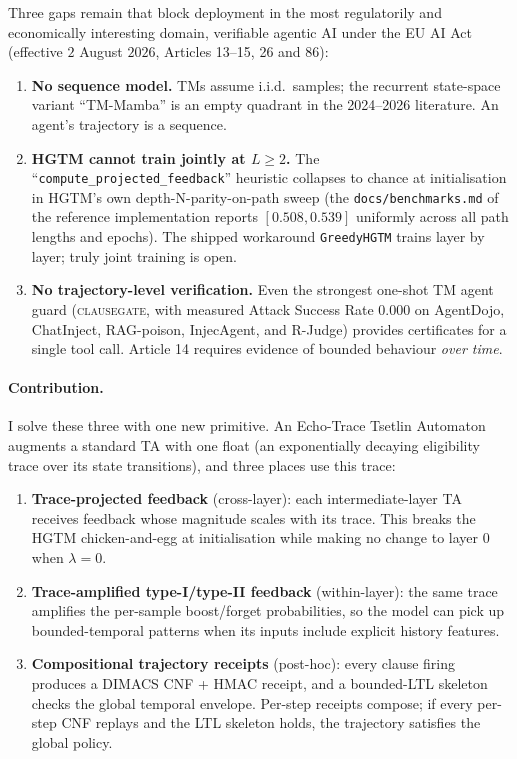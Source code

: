 \documentclass[11pt]{article}
\begin{document}
Three gaps remain that block deployment in the most regulatorily and economically interesting domain, verifiable agentic AI under the EU AI Act (effective $2$ August $2026$, Articles 13--15, 26 and 86):

\begin{enumerate}[label=(\roman*)]
\item \textbf{No sequence model.} TMs assume i.i.d.\ samples; the recurrent state-space variant ``TM-Mamba'' is an empty quadrant in the 2024--2026 literature.  An agent's trajectory is a sequence.
\item \textbf{HGTM cannot train jointly at $L \!\geq\! 2$.} The ``\texttt{compute\_projected\_feedback}'' heuristic collapses to chance at initialisation in HGTM's own depth-N-parity-on-path sweep (the \texttt{docs/benchmarks.md} of the reference implementation reports $[0.508, 0.539]$ uniformly across all path lengths and epochs).  The shipped workaround \texttt{GreedyHGTM} trains layer by layer; truly joint training is open.
\item \textbf{No trajectory-level verification.} Even the strongest one-shot TM agent guard (\textsc{clausegate}, with measured Attack Success Rate $0.000$ on AgentDojo, ChatInject, RAG-poison, InjecAgent, and R-Judge) provides certificates for a single tool call.  Article 14 requires evidence of bounded behaviour \emph{over time}.
\end{enumerate}

\paragraph{Contribution.}  I solve these three with one new primitive.  An Echo-Trace Tsetlin Automaton augments a standard TA with one float (an exponentially decaying eligibility trace over its state transitions), and three places use this trace:

\begin{enumerate}
\item \textbf{Trace-projected feedback} (cross-layer): each intermediate-layer TA receives feedback whose magnitude scales with its trace.  This breaks the HGTM chicken-and-egg at initialisation while making no change to layer 0 when $\lambda=0$.
\item \textbf{Trace-amplified type-I/type-II feedback} (within-layer): the same trace amplifies the per-sample boost/forget probabilities, so the model can pick up bounded-temporal patterns when its inputs include explicit history features.
\item \textbf{Compositional trajectory receipts} (post-hoc): every clause firing produces a DIMACS CNF + HMAC receipt, and a bounded-LTL skeleton checks the global temporal envelope.  Per-step receipts compose; if every per-step CNF replays and the LTL skeleton holds, the trajectory satisfies the global policy.
\end{enumerate}
\end{document}
